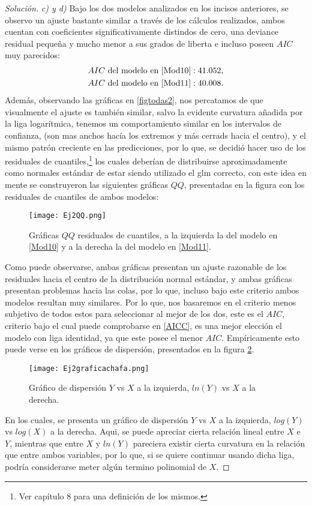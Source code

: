 \documentclass[10.5pt,notitlepage]{article}
\newenvironment{solucion}
  {\begin{proof}[Solución]}
  {\end{proof}}
\theoremstyle{plain}
\begin{document}
\begin{solucion}
\textit{c) y d)} Bajo los dos modelos analizados en los incisos anteriores, se observo un ajuste bastante similar a través de los cálculos realizados, ambos cuentan con coeficientes significativamente distindos de cero, una deviance residual pequeña y mucho menor a sus grados de liberta e incluso poseen \(AIC\) muy parecidos: 
\begin{align}
    AIC \text{ del modelo en \eqref{Mod10}}: 41.052, \nonumber\\ 
    AIC \text{ del modelo en \eqref{Mod11}}: 40.008 \label{AICC}. 
\end{align}
Además, observando las gráficas en \eqref{figtodas2}, nos percatamos de que visualmente el ajuste es también similar, salvo la evidente curvatura añadida por la liga logarítmica, tenemos un comportamiento similar en los intervalos de confianza, (son mas anchos hacía los extremos y más cerrads hacia el centro), y el mismo patrón creciente en las predicciones, por lo que, se decidió hacer uso de los residuales de cuantiles,\footnote{Ver \textcite{dunn_generalized_2018} capítulo 8  para una definición de los mismos.} los cuales deberían de distribuirse aproximadamente como normales estándar de estar siendo utilizado el glm correcto, con este idea en mente se construyeron las siguientes gráficas \(QQ\), presentadas en la figura \label{QQ} con los residuales de cuantiles de ambos modelos:
\begin{figure}[htb]
    \centering
    \texttt{[image: Ej2QQ.png]}
    \caption{Gráficas \(QQ\) residuales de cuantiles, a la izquierda la del modelo en \eqref{Mod10} y  a la derecha la del modelo en \eqref{Mod11}.}
    \label{QQ}
\end{figure}
Como puede observarse, ambas gráficas presentan un ajuste razonable de los residuales hacia el centro de la distribución normal estándar, y ambas gráficas presentan problemas hacia las colas, por lo que, incluso bajo este criterio ambos modelos resultan muy similares. Por lo que, nos basaremos en el criterio menos subjetivo de todos estos para seleccionar al mejor de los dos, este es el \(AIC\), criterio bajo el cual puede comprobarse en \eqref{AICC}, es una mejor elección el modelo con liga identidad, ya que este posee el menor \(AIC\). Empíricamente esto puede verse en los gráficos de dispersión, presentados en la figura \ref{chafa}. 
\begin{figure}[htb]
    \centering
    \texttt{[image: Ej2graficachafa.png]}
    \caption{Gráfico de dispersión \(Y\) vs \(X\) a la izquierda, \(ln(Y)\) vs \(X\) a la derecha.}
    \label{chafa}
\end{figure}
En los cuales, se presenta un gráfico de dispersión \(Y\) vs \(X\) a la izquierda, \(log(Y)\) vs \(log(X)\) a la derecha. Aqui, se puede apreciar cierta relación lineal entre \(X\) e \(Y\), mientras que entre \(X\) y \(ln(Y)\) pareciera existir cierta curvatura en la relación que entre ambos variables, por lo que, si se quiere continuar usando dicha liga, podría considerarse meter algún termino polinomial de \(X\).
\end{solucion}
\end{document}
